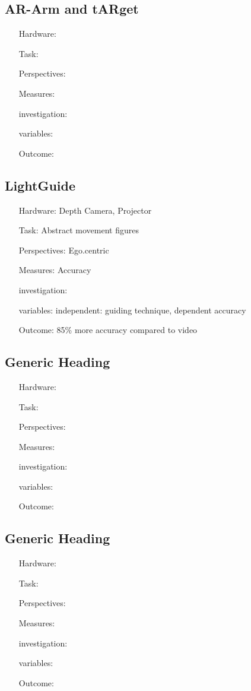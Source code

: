 \subsection{AR-Arm and tARget}
\begin{itemize}
	\item[Hardware:] 
	\item[Task:] 
	\item[Perspectives:] 
	\item[Measures:] 
	\item[investigation:] 
	\item[variables:] 
	\item[Outcome:] 
\end{itemize}

\subsection{LightGuide}
\begin{itemize}
	\item[Hardware:] Depth Camera, Projector 
	\item[Task:] Abstract movement figures
	\item[Perspectives:] Ego.centric
	\item[Measures:] Accuracy
	\item[investigation:] 
	\item[variables:] independent: guiding technique, dependent accuracy
	\item[Outcome:] 85\% more accuracy compared to video
\end{itemize}

\subsection{Generic Heading}
\begin{itemize}
	\item[Hardware:] 
	\item[Task:] 
	\item[Perspectives:] 
	\item[Measures:] 
	\item[investigation:] 
	\item[variables:] 
	\item[Outcome:] 
\end{itemize}

\subsection{Generic Heading}
\begin{itemize}
	\item[Hardware:] 
	\item[Task:] 
	\item[Perspectives:] 
	\item[Measures:] 
	\item[investigation:] 
	\item[variables:] 
	\item[Outcome:] 
\end{itemize}

